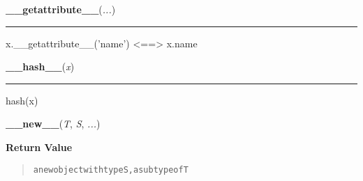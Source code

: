     \label{object:__getattribute__}

    \vspace{0.5ex}

    \begin{boxedminipage}{\textwidth}

    \raggedright \textbf{\_\_getattribute\_\_}(\textit{...})

    \vspace{-1.5ex}

    \rule{\textwidth}{0.5\fboxrule}
    x.\_\_getattribute\_\_('name') {\textless}=={\textgreater} x.name

    \vspace{1ex}

    \end{boxedminipage}

    \label{object:__hash__}

    \vspace{0.5ex}

    \begin{boxedminipage}{\textwidth}

    \raggedright \textbf{\_\_hash\_\_}(\textit{x})

    \vspace{-1.5ex}

    \rule{\textwidth}{0.5\fboxrule}
    hash(x)

    \vspace{1ex}

    \end{boxedminipage}

    \label{object:__new__}

    \vspace{0.5ex}

    \begin{boxedminipage}{\textwidth}

    \raggedright \textbf{\_\_new\_\_}(\textit{T}, \textit{S}, \textit{...})

      \textbf{Return Value}
      \begin{quote}
\begin{alltt}
a new object with type S, a subtype of T
\end{alltt}

      \end{quote}

    \vspace{1ex}

    \end{boxedminipage}


